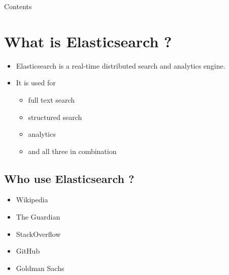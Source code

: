 \documentclass[]{beamer}
\title[\titreShort{}]{\titreEntete{}}%
\author[\authorVar{}]{\authorVar{}}
\date[\datec{}]{\datec{}}%
\institute[Linagora]{Linagora}%
\begin{document}
\begin{frame}
  \titlepage
\end{frame}

\begin{frame}{Contents}
  \tableofcontents[hideallsubsections]%
\end{frame}


\section{What is Elasticsearch ?}


\begin{frame}{\secname{}}
  \begin{itemize}
    \item Elasticsearch is a real-time distributed search and analytics engine.
    \item It is used for
    \begin{itemize}
       \item full text search
       \item structured search
       \item analytics
       \item and all three in combination
     \end{itemize}
  \end{itemize}
\end{frame}

\subsection{Who use Elasticsearch ?}

\begin{frame}{\subsecname{}}
  \begin{itemize}
    \item Wikipedia
    \item The Guardian
    \item StackOverflow
    \item GitHub
    \item Goldman Sachs
  \end{itemize}
\end{frame}
\end{document}
